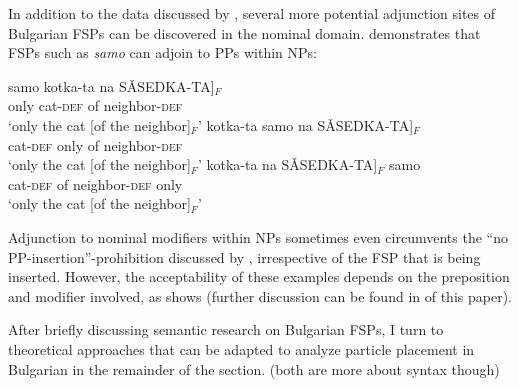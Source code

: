 \documentclass[output=paper,colorlinks,citecolor=brown]{langscibook}
\begin{document}
In addition to the data discussed by \citet{TishevaDzhonova2003}, several more potential adjunction sites of Bulgarian FSPs can be discovered in the nominal domain.  demonstrates that FSPs such as \textit{samo} can adjoin to PPs within NPs:

\ea\label{nominal1}
\ea
\gll samo kotka-ta \minsp{[} na S\v{A}SEDKA-TA]$_{F}$ \\
 only cat-\textsc{def} {} of neighbor-\textsc{def} \\
\glt `only the cat [of the neighbor]$_{F}$’
\ex
\gll kotka-ta samo \minsp{[} na S\v{A}SEDKA-TA]$_{F}$ \\
cat-\textsc{def} only {} of neighbor-\textsc{def} \\
\glt `only the cat [of the neighbor]$_{F}$’
\ex
\gll kotka-ta \minsp{[} na S\v{A}SEDKA-TA]$_{F}$ samo \\
cat-\textsc{def} {} of neighbor-\textsc{def} only \\
\glt `only the cat [of the neighbor]$_{F}$’
\z
\z

\noindent Adjunction to nominal modifiers within NPs sometimes even circumvents the ``no PP-insertion''-prohibition discussed by \citet{TishevaDzhonova2003}, irrespective of the FSP that is being inserted. However, the acceptability of these examples depends on the preposition and modifier involved, as  shows (further discussion can be found in  of this paper). 

\ea\label{nominal2}
\z
\z 

\noindent After briefly discussing semantic research on Bulgarian FSPs, I turn to theoretical approaches that can be adapted to analyze particle placement in Bulgarian in the remainder of the section. (both are more about syntax though)
\end{document}
